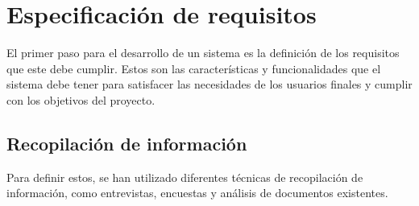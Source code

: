 \chapter{Especificación de requisitos}\label{cap:especificación}

El primer paso para el desarrollo de un sistema es la definición de los requisitos que este debe cumplir. Estos son las características y funcionalidades que el sistema debe tener para satisfacer las necesidades de los usuarios finales y cumplir con los objetivos del proyecto. 
\section{Recopilación de información}

Para definir estos, se han utilizado diferentes técnicas de recopilación de información, como entrevistas, encuestas y análisis de documentos existentes. 


